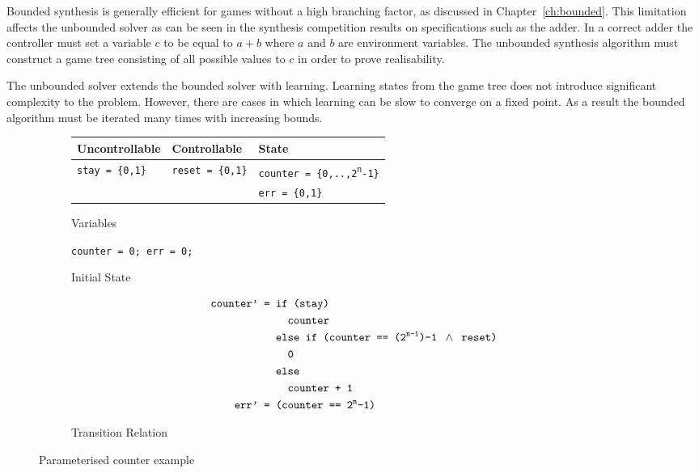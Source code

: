 Bounded synthesis is generally efficient for games without a high branching factor, as discussed in Chapter~\ref{ch:bounded}. This limitation affects the unbounded solver as can be seen in the synthesis competition results on specifications such as the adder. In a correct adder the controller must set a variable $c$ to be equal to $a + b$ where $a$ and $b$ are environment variables. The unbounded synthesis algorithm must construct a game tree consisting of all possible values to $c$ in order to prove realisability.

The unbounded solver extends the bounded solver with learning. Learning states from the game tree does not introduce significant complexity to the problem. However, there are cases in which learning can be slow to converge on a fixed point. As a result the bounded algorithm must be iterated many times with increasing bounds.

\begin{figure}
    \begin{subfigure}[t]{\textwidth}
        \centering
        \begin{tabular}{l | l | l}
            \textbf{Uncontrollable} & \textbf{Controllable} & \textbf{State} \\
            \hline
            \texttt{stay = \{0,1\}} & \texttt{reset = \{0,1\}} & \texttt{counter = \{0,..,2\textsuperscript{n}-1\}} \\
                                    & & \texttt{err = \{0,1\}}
        \end{tabular}
        \caption{Variables}
        \label{fig:examplevars}
    \end{subfigure}

    \vspace{5mm}
    \begin{subfigure}[t]{\textwidth}
        \centering
        \texttt{counter = 0; err = 0;}
        \caption{Initial State}
        \label{fig:exampleinit}
    \end{subfigure}

    \begin{subfigure}[t]{\textwidth}
        \begin {align*}
        \texttt{counter' = }{}& \texttt{if (stay)} \\
        {}& \texttt{\ \ counter} \\
        {}& \texttt{else if (counter == (2\textsuperscript{n-1})-1 } \land \texttt{ reset)} \\
        {}& \texttt{\ \ 0} \\
        {}& \texttt{else} \\
        {}& \texttt{\ \ counter + 1} \\
        \texttt{err' = }{}& \texttt{(counter == 2\textsuperscript{n}-1)}
        \end{align*}
        \caption{Transition Relation}
        \label{fig:exampletrans}
    \end{subfigure}
    \caption{Parameterised counter example}
    \label{fig:counter}
\end{figure}

